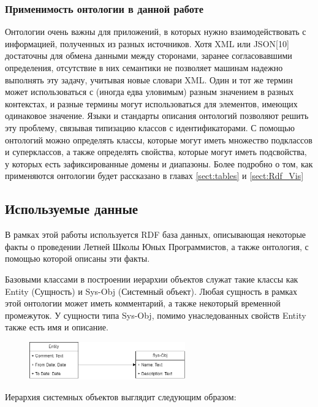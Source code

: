 \documentclass[12pt]{article}
\begin{document}
\subsubsection{Применимость онтологии в данной работе}
\qquad Онтологии очень важны для приложений, в которых нужно взаимодействовать с информацией, полученных из разных источников. Хотя XML или JSON[10] достаточны для обмена данными между сторонами, заранее согласовавшими определения, отсутствие в них семантики не позволяет машинам надежно выполнять эту задачу, учитывая новые словари XML. Один и тот же термин может использоваться с (иногда едва уловимым) разным значением в разных контекстах, и разные термины могут использоваться для элементов, имеющих одинаковое значение. Языки и стандарты описания онтологий позволяют решить эту проблему, связывая типизацию классов с идентификаторами. С помощью онтологий можно определять классы, которые могут иметь множество подклассов и суперклассов, а также определять свойства, которые могут иметь подсвойства, у которых есть зафиксированные домены и диапазоны. Более подробно о том, как применяются онтологии будет рассказано в главах \ref{sect:tables} и \ref{sect:Rdf_Vis}

\subsection{Используемые данные}
\qquad В рамках этой работы используется RDF база данных, описывающая некоторые факты о проведении Летней Школы Юных Программистов, а также онтология, с помощью которой описаны эти факты.

Базовыми классами в построении иерархии объектов служат такие классы как Entity (Сущность) и Sys-Obj (Системный объект). Любая сущность в рамках этой онтологии может иметь комментарий, а также некоторый временной промежуток. У сущности типа Sys-Obj, помимо унаследованных свойств Entity также есть имя и описание.

\begin{figure}[!ht]
    \centering
    \includegraphics[width=0.6\textwidth]{_images/base_sch_onto.png}
\end{figure}

Иерархия системных объектов выглядит следующим образом:
\end{document}
